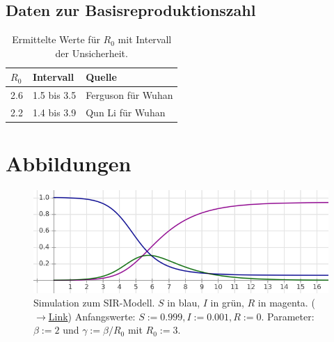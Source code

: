 \documentclass[a4paper,11pt,fleqn,twocolumn,twoside,dvipdfmx]{scrartcl}
\numberwithin{equation}{section}
\begin{document}
\newpage
\subsection{Daten zur Basisreproduktionszahl}
\vspace{-6mm}
\begin{table}[h]
\caption{Ermittelte Werte für $R_0$ mit\newline
Intervall der Unsicherheit.}
\begin{tabular}{lll}
\toprule
$R_0$ & Intervall & Quelle\\
\midrule
2.6 & 1.5 bis 3.5 & Ferguson für Wuhan \cite{Ferguson}\\
2.2 & 1.4 bis 3.9 & Qun Li für Wuhan \cite{QunLi}\\
\bottomrule
\end{tabular}
\end{table}

\clearpage
\onecolumn
\section{Abbildungen}

\begin{figure}[h]
\includegraphics[width=14cm]{img/SIR-Simulation-R0-drei.png}
\caption{Simulation zum SIR-Modell.
$S$ in blau, $I$ in grün, $R$ in magenta.\;\;%
(\href{https://cas-de.github.io/plot.htm?S(t),I(t),R(t);%
\%20\%5bS,I,R\%5d\%27=\%5b-beta*I*S,beta*I*S-gamma*I,gamma*I\%5d;%
\%20p:=\%5b0,0.999,0.001,0\%5d;\%20gamma:=beta/3;\%20beta:=2;%
\%20tw(0,40);;scale(1,0.2),P(10.2,0.5)}{$\rightarrow$Link})%
\newline
Anfangswerte: $S:=0.999,I:=0.001,R:=0$.\newline
Parameter: $\beta:=2$ und $\gamma:=\beta/R_0$ mit $R_0:=3$.}
\label{fig:R0-drei}
\end{figure}
\end{document}
